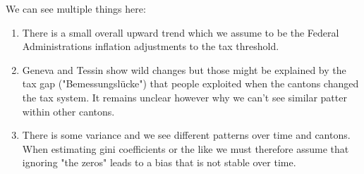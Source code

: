 \begin{knitrout}
\color{fgcolor}\begin{kframe}
\begin{alltt}
\hlopt{$} \hlkwb{<-} \hlopt{$}\hlopt{/}\hlopt{$}  
\end{alltt}


{\ttfamily\noindent\bfseries\color{errorcolor}{\#\# Error: Objekt des Typs 'closure' ist nicht indizierbar}}\begin{alltt}
\hlstd{(df[df}\hlopt{$} \hlopt{>=} \hlstd{, ],} \hlstd{(}    \hlopt{+}
    \hlstd{()} \hlopt{+} \hlstd{(}\hlopt{~}
\end{alltt}


{\ttfamily\noindent\bfseries\color{errorcolor}{\#\# Error: Objekt des Typs 'closure' ist nicht indizierbar}}\begin{alltt}
\hlstd{(df[df}\hlopt{$} \hlopt{>=} \hlstd{, ],} \hlstd{(}    \hlopt{+}
    \hlstd{()} \hlopt{+} \hlstd{(}\hlopt{~} \hlopt{+} \hlstd{(}\hlstd{(}   \hlstd{=} \hlstd{)}
\end{alltt}


{\ttfamily\noindent\bfseries\color{errorcolor}{\#\# Error: Objekt des Typs 'closure' ist nicht indizierbar}}\end{kframe}
\end{knitrout}


We can see multiple things here:

\begin{enumerate}
\item There is a small overall upward trend which we assume to be the Federal Administrations inflation adjustments to the tax threshold.
\item Geneva and Tessin show wild changes but those might be explained by the tax gap ("Bemessungslücke") that people exploited when the cantons changed the tax system. It remains unclear however why we can't see similar patter within other cantons.
\item There is some variance and we see different patterns over time and cantons. When estimating gini coefficients or the like we must therefore assume that ignoring "the zeros" leads to a bias that is not stable over time.
\end{enumerate}

